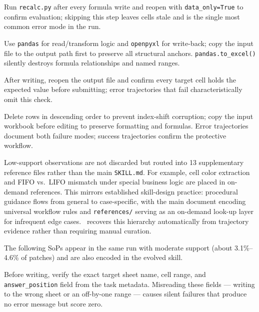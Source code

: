 Run \texttt{recalc.py} after every formula write and reopen with \texttt{data\_only=True} to confirm evaluation; skipping this step leaves cells stale and is the single most common error mode in the run.

Use \texttt{pandas} for read/transform logic and \texttt{openpyxl} for write-back; copy the input file to the output path first to preserve all structural anchors. \texttt{pandas.to\_excel()} silently destroys formula relationships and named ranges.

After writing, reopen the output file and confirm every target cell holds the expected value before submitting; error trajectories that fail characteristically omit this check.

Delete rows in descending order to prevent index-shift corruption; copy the input workbook before editing to preserve formatting and formulas. Error trajectories document both failure modes; success trajectories confirm the protective workflow.

Low-support observations are not discarded but routed into 13 supplementary reference files rather than the main \texttt{SKILL.md}. For example, cell color extraction and FIFO vs.\ LIFO mismatch under special business logic are placed in on-demand references.
This mirrors established skill-design practice: procedural guidance flows from general to case-specific, with the main document encoding universal workflow rules and \texttt{references/} serving as an on-demand look-up layer for infrequent edge cases.
\systemname~recovers this hierarchy automatically from trajectory evidence rather than requiring manual curation.

The following SoPs appear in the same run with moderate support (about 3.1\%--4.6\% of patches) and are also encoded in the evolved skill.

Before writing, verify the exact target sheet name, cell range, and \texttt{answer\_position} field from the task metadata.
Misreading these fields --- writing to the wrong sheet or an off-by-one range --- causes silent failures that produce no error message but score zero.

